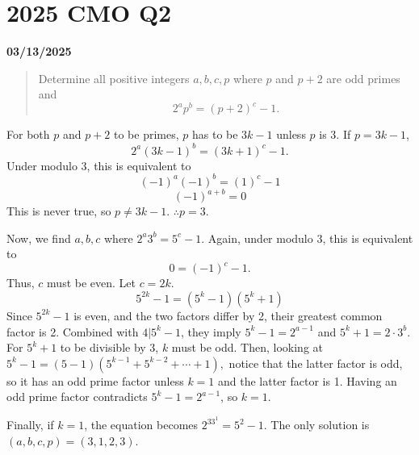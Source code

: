 \documentclass[12pt, oneside]{article}
\begin{document}
\section*{2025 CMO Q2}
\textbf{03/13/2025}
\begin{quote}
Determine all positive integers $a, b, c, p$ where $p$ and $p + 2$ are odd primes and
\[2^ap^b = (p + 2)^c - 1.\]
\end{quote}
For both $p$ and $p+2$ to be primes, $p$ has to be $3k-1$ unless $p$ is 3. If $p=3k-1$,
\[2^a(3k-1)^b = (3k + 1)^c - 1.\]
Under modulo 3, this is equivalent to
\[(-1)^a(-1)^b = (1)^c - 1\]
\[(-1)^{a+b} = 0\]
This is never true, so $p \neq 3k-1$. $\therefore p=3$.

Now, we find $a, b, c$ where $2^a3^b = 5^c - 1$. Again, under modulo 3, this is equivalent to
\[0 = (-1)^c - 1.\]
Thus, $c$ must be even. Let $c=2k$.
\[5^{2k} - 1 = (5^k - 1) (5^k + 1)\]
Since $5^{2k}-1$ is even, and the two factors differ by 2, their greatest common factor is 2. Combined with $4|5^k-1$, they imply $5^k-1 = 2^{a-1}$ and $5^k+1 = 2 \cdot 3^b$. For $5^k+1$ to be divisible by 3, $k$ must be odd. Then, looking at $5^k -1 = (5 - 1)(5^{k-1} + 5^{k-2} + \cdots + 1), $ notice that the latter factor is odd, so it has an odd prime factor unless $k=1$ and the latter factor is 1. Having an odd prime factor contradicts $5^k -1 = 2^{a-1}$, so $k=1$.

Finally, if $k=1$, the equation becomes $2^33^1 = 5^2 - 1$. The only solution is $(a, b, c, p) = (3, 1, 2, 3)$.
\end{document}
